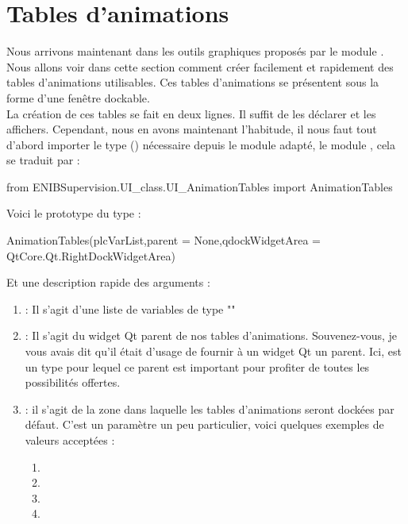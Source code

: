 \section{Tables d'animations}

Nous arrivons maintenant dans les outils graphiques proposés par le module .\newline
Nous allons voir dans cette section comment créer facilement et rapidement des tables d'animations utilisables.\newline
Ces tables d'animations se présentent sous la forme d'une fenêtre dockable.\\

La création de ces tables se fait en deux lignes. Il suffit de les déclarer et les affichers.\newline
Cependant, nous en avons maintenant l'habitude, il nous faut tout d'abord importer le type () nécessaire depuis le module adapté, le module , cela se traduit par :
\begin{Python}
from ENIBSupervision.UI_class.UI_AnimationTables import AnimationTables
\end{Python}


Voici le prototype du type  :
\begin{Python}
AnimationTables(plcVarList,parent = None,qdockWidgetArea = QtCore.Qt.RightDockWidgetArea)
\end{Python}
Et une description rapide des arguments :
\begin{enumerate}
    \item {} : Il s'agit d'une liste de variables de type ""
    \item {} : Il s'agit du widget Qt parent de nos tables d'animations. Souvenez-vous, je vous avais dit qu'il était d'usage de fournir à un widget Qt un parent. Ici,  est un type pour lequel ce parent est important pour profiter de toutes les possibilités offertes.
    \item {} : il s'agit de la zone dans laquelle les tables d'animations seront dockées par défaut. C'est un paramètre un peu particulier, voici quelques exemples de valeurs acceptées :
    \begin{enumerate}
        \item {}
        \item {}
        \item {}
        \item {}
    \end{enumerate}
\end{enumerate}


